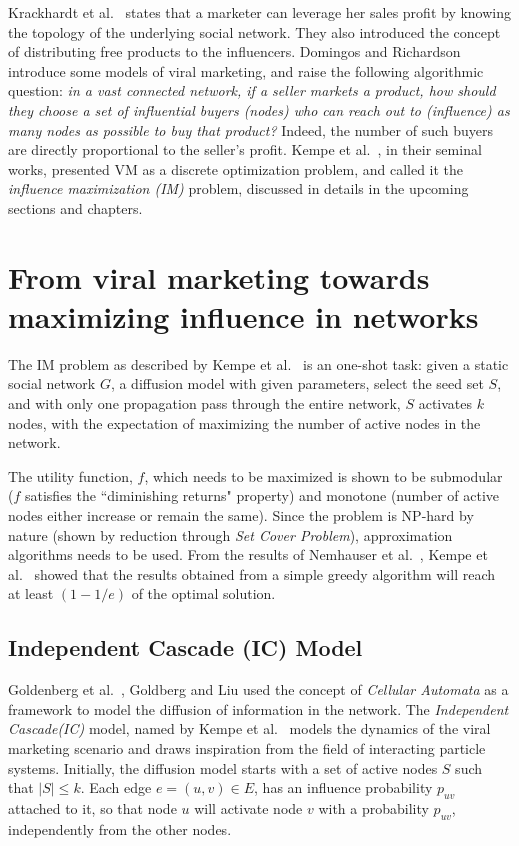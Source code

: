Krackhardt et al.~\cite{Iacobucci2014} states that a marketer can leverage her sales profit by knowing the topology of the underlying social network. They also introduced the concept of distributing free products to the influencers. Domingos and Richardson~\cite{Domingos2001,Richardson2002} introduce some models of viral marketing, and raise the following algorithmic question: \textit{in a vast connected network, if a seller markets a product, how should they choose a set of influential buyers (nodes) who can reach out to (influence) as many nodes as possible to buy that product?} Indeed, the number of such buyers are directly proportional to the seller's profit. Kempe et al.~\cite{Kempe2003,kempe05,Kempe2015}, in their seminal works, presented VM as a discrete optimization problem, and called it the \emph{influence maximization (IM)} problem, discussed in details in the upcoming sections and chapters.      

\section{From viral marketing towards maximizing influence in networks}

The IM problem as described by Kempe et al.~\cite{Kempe2003} is an one-shot task: given a static social network $G$, a diffusion model with given parameters, select the seed set $S$, and with only one propagation pass through the entire network, $S$ activates $k$ nodes, with the expectation of maximizing the number of active nodes in the network. 


The utility function, $f$, which needs to be maximized is shown to be submodular ($f$ satisfies the ``diminishing returns" property) and  monotone (number of active nodes either increase or remain the same). Since the problem is NP-hard by nature (shown by reduction through \textit{Set Cover Problem}), approximation algorithms needs to be used. From the results of Nemhauser et al.~\cite{Company1978, nemhauser}, Kempe et al.~\cite{Kempe2003} showed that the results obtained from a simple greedy algorithm will reach at least $(1-1/e)$ of the optimal solution.


\subsection*{Independent Cascade (IC) Model}

Goldenberg et al.~\cite{J.2001}, Goldberg and Liu \cite{Goldberg2013} used the concept of \emph{Cellular Automata} as a framework to model the diffusion of information in the network. The \emph{Independent Cascade(IC)} model, named by Kempe et al.~\cite{Kempe2003} models the dynamics of the viral marketing scenario and draws inspiration from the field of interacting particle systems. Initially, the diffusion model starts with a set of active nodes $S$ such that $|S| \leq k$. Each edge $e=(u,v)\in E$, has an influence probability $p_{uv}$ attached to it, so that node $u$ will activate node $v$ with a probability $p_{uv}$, independently from the other nodes. 

